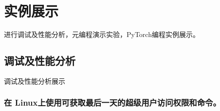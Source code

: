 \documentclass[UTF8]{ctexart}
\begin{document}
\section{实例展示}
{\color{red}进行调试及性能分析，元编程演示实验，PyTorch编程实例展示。}
  \subsection{调试及性能分析}
  {\color{blue}调试及性能分析展示}



\subsubsection{在 Linux上使用可获取最后一天的超级用户访问权限和命令。}
\end{document}
